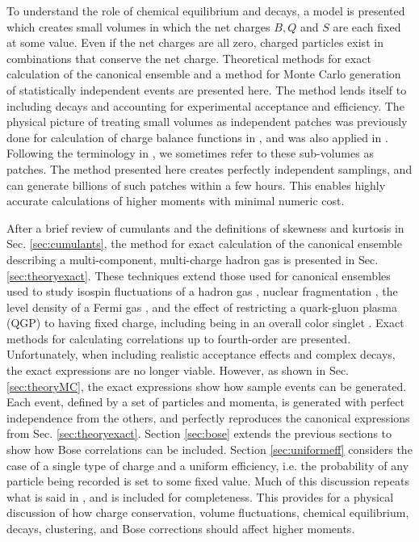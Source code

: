To understand the role of chemical equilibrium and decays, a model is presented which creates small volumes in which the net charges $B,Q$ and $S$ are each fixed at some value. Even if the net charges are all zero, charged particles exist in combinations that conserve the net charge. Theoretical methods for exact calculation of the canonical ensemble and a method for Monte Carlo generation of statistically independent events are presented here. The method lends itself to including decays and accounting for experimental acceptance and efficiency. The physical picture of treating small volumes as independent patches was previously done for calculation of charge balance functions in \cite{Schlichting:2010qia,Schlichting:2010na,Pratt:2010zn}, and was also applied in \cite{Oliinychenko:2020cmr}. Following the terminology in \cite{Oliinychenko:2020cmr}, we sometimes refer to these sub-volumes as patches. The method presented here creates perfectly independent samplings, and can generate billions of such patches within a few hours. This enables highly accurate calculations of higher moments with minimal numeric cost.

After a brief review of cumulants and the definitions of skewness and kurtosis in Sec. \ref{sec:cumulants}, the method for exact calculation of the canonical ensemble describing a multi-component, multi-charge hadron gas is presented in Sec. \ref{sec:theoryexact}. These techniques extend those used for canonical ensembles used to study isospin fluctuations of a hadron gas \cite{Cheng:2002jb}, nuclear fragmentation \cite{Pratt:1999ht}, the level density of a Fermi gas \cite{Pratt:1999ns}, and the effect of restricting a quark-gluon plasma (QGP) to having fixed charge, including being in an overall color singlet \cite{Pratt:2003jd}. Exact methods for calculating correlations up to fourth-order are presented. Unfortunately, when including realistic acceptance effects and complex decays, the exact expressions are no longer viable. However, as shown in Sec. \ref{sec:theoryMC}, the exact expressions show how sample events can be generated. Each event, defined by a set of particles and momenta, is generated with perfect independence from the others, and perfectly reproduces the canonical expressions from Sec. \ref{sec:theoryexact}. Section \ref{sec:bose} extends the previous sections to show how Bose correlations can be included. Section \ref{sec:uniformeff} considers the case of a single type of charge and a uniform efficiency, i.e. the probability of any particle being recorded is set to some fixed value. Much of this discussion repeats what is said in \cite{Savchuk:2019xfg}, and is included for completeness. This provides for a physical discussion of how charge conservation, volume fluctuations, chemical equilibrium, decays, clustering, and Bose corrections should affect higher moments.

